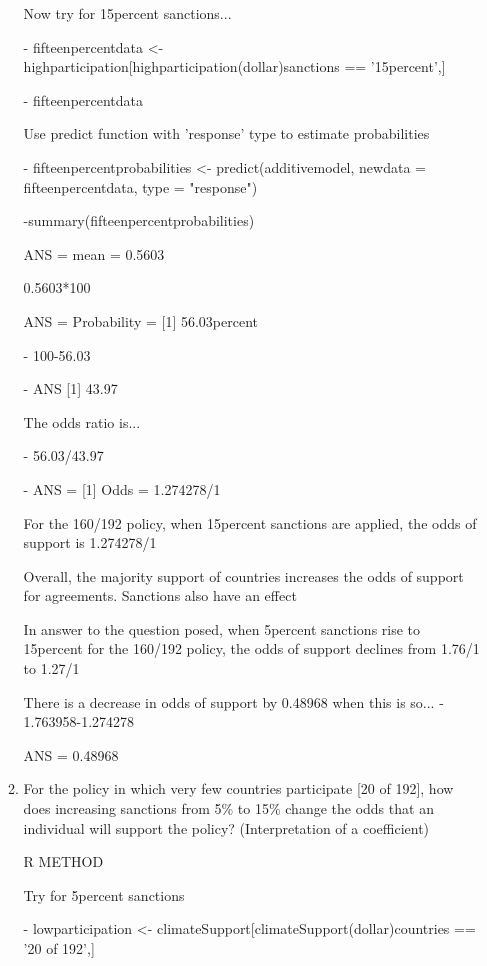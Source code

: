 \documentclass[12pt,letterpaper]{article}
\begin{document}
\begin{enumerate}
\begin{enumerate}
		\vspace{1cm}
		
Now try for 15percent sanctions...

		- fifteenpercentdata <- highparticipation[highparticipation(dollar)sanctions == '15percent',]
		
		- fifteenpercentdata

Use predict function with 'response' type to estimate probabilities
	
		- fifteenpercentprobabilities <- predict(additivemodel, newdata = fifteenpercentdata, type = "response")
		
		-summary(fifteenpercentprobabilities) 
		
		ANS = mean = 0.5603
	
		0.5603*100 

 ANS = Probability = [1] 56.03percent
	
		- 100-56.03 
		
		- ANS [1] 43.97

The odds ratio is...
	
		- 56.03/43.97 
		
		- ANS = [1] Odds = 1.274278/1 

For the 160/192 policy, when 15percent sanctions are applied, the odds of support is 1.274278/1
				\vspace{1cm}
				
Overall, the majority support of countries increases the odds of support for agreements. Sanctions also have an effect

In answer to the question posed, when 5percent sanctions rise to 15percent for the 160/192 policy, the odds of support declines from 1.76/1 to 1.27/1

There is a decrease in odds of support by 0.48968 when this is so...
		- 1.763958-1.274278 
		
		ANS  = 0.48968
				\vspace{1cm}
				
		\item
		For the policy in which very few countries participate [20 of 192], how does increasing sanctions from 5\% to 15\% change the odds that an individual will support the policy? (Interpretation of a coefficient)
				\vspace{1cm}
	
	R METHOD
		\vspace{1cm}
		

Try for 5percent sanctions
	
	- lowparticipation <-  climateSupport[climateSupport(dollar)countries == '20 of 192',]
	

\end{enumerate}
\end{enumerate}
\end{document}
